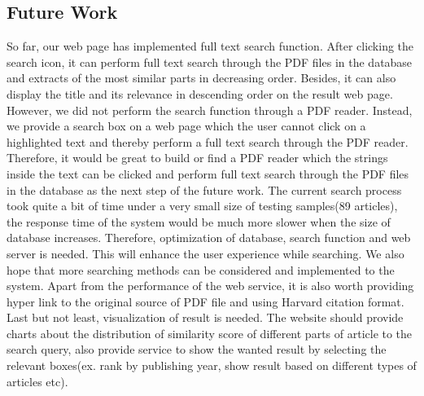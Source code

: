 
\subsection{Future Work}
So far, our web page has  implemented full text search function. After clicking the search icon, it can perform full text search through the PDF files in the database and extracts of the most similar parts in decreasing order. Besides, it can also display the title and its relevance in descending order  on the result web page.
However, we did not perform the search function through a PDF reader. Instead, we provide a search box on a web page which the user cannot click on a highlighted text and thereby perform a full text search through the PDF reader. Therefore, it would be great to build or find a PDF reader which the strings inside the text can be clicked and perform full text search through the PDF files in the database as the next step of the future work. The current search process took quite a bit of time under a very small size of testing samples(89 articles), the response time of the system would be much more slower when the size of database increases. Therefore, optimization of database, search function and web server is needed. This will enhance the user experience while searching. We also hope that more searching methods can be considered and implemented to the system. Apart from the performance of the web service, it is also worth providing hyper link to the original source of PDF file and using Harvard citation format.
Last but not least, visualization of result is needed. The website should provide charts about the distribution of similarity score of different parts of article to the search query, also provide service to show the wanted result by selecting the relevant boxes(ex. rank by publishing year, show result based on different types of articles etc).